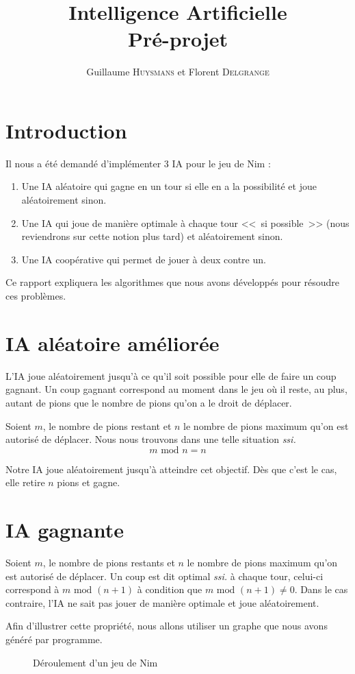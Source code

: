 \documentclass[10pt,a4paper]{article}
\author{Guillaume \textsc{Huysmans} et Florent \textsc{Delgrange}}
\title{Intelligence Artificielle\\Pré-projet}
\newcommand{\ssi}{\textit{ssi. }}
\renewcommand{\mod}{\text{ mod }}
\begin{document}
\maketitle
\section{Introduction}
Il nous a été demandé d'implémenter 3 IA pour le jeu de Nim :
\begin{enumerate}
\item Une IA aléatoire qui gagne en un tour si elle en a la possibilité et joue
	aléatoirement sinon.
\item Une IA qui joue de manière optimale à chaque tour <<~si possible~>>
	(nous reviendrons sur cette notion plus tard) et aléatoirement sinon.
\item Une IA coopérative qui permet de jouer à deux contre un.
\end{enumerate}

Ce rapport expliquera les algorithmes que nous avons développés
pour résoudre ces problèmes.

\section{IA aléatoire améliorée}
L'IA joue aléatoirement jusqu'à ce qu'il soit possible pour elle de faire un
coup gagnant. Un coup gagnant correspond au moment dans le jeu où il reste, au
plus, autant de pions que le nombre de pions qu'on a le droit de déplacer.

Soient $m$, le nombre de pions restant et $n$ le nombre de pions maximum qu'on
est autorisé de déplacer. Nous nous trouvons dans une telle situation \ssi
\[m \mod n = n\]

Notre IA joue aléatoirement jusqu'à atteindre cet objectif.
Dès que c'est le cas, elle retire $n$ pions et gagne.

\section{IA gagnante}
Soient $m$, le nombre de pions restants et $n$ le nombre de pions maximum qu'on
est autorisé de déplacer. Un coup est dit optimal \ssi à chaque tour,
celui-ci correspond à $m \mod (n+1)$ à condition que $m \mod (n+1) \neq 0$.
Dans le cas contraire, l'IA ne sait pas jouer de manière optimale et joue
aléatoirement.

Afin d'illustrer cette propriété, nous allons utiliser un
graphe que nous avons généré par programme.
\begin{figure}
\label{nim12}
\caption{Déroulement d'un jeu de Nim}
\end{figure}
\end{document}
